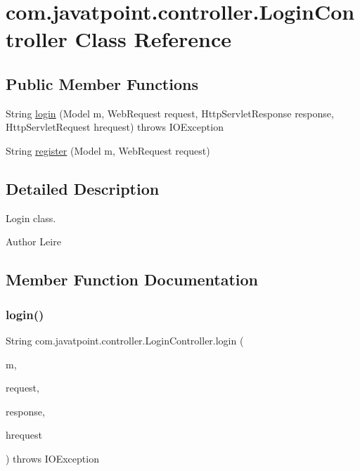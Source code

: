 \hypertarget{classcom_1_1javatpoint_1_1controller_1_1_login_controller}{}\section{com.\+javatpoint.\+controller.\+Login\+Controller Class Reference}
\label{classcom_1_1javatpoint_1_1controller_1_1_login_controller}
\subsection*{Public Member Functions}
\begin{DoxyCompactItemize}
\item 
String \mbox{\hyperlink{classcom_1_1javatpoint_1_1controller_1_1_login_controller_ac14f5ffa8f3fcdd0a908cb1311f12393}{login}} (Model m, Web\+Request request, Http\+Servlet\+Response response, Http\+Servlet\+Request hrequest)  throws I\+O\+Exception 
\item 
String \mbox{\hyperlink{classcom_1_1javatpoint_1_1controller_1_1_login_controller_adb27cb866c614d9060fd6cd3db3c4a3a}{register}} (Model m, Web\+Request request)
\end{DoxyCompactItemize}


\subsection{Detailed Description}
Login class.

\begin{DoxyAuthor}{Author}
Leire 
\end{DoxyAuthor}


\subsection{Member Function Documentation}
\mbox{\label{classcom_1_1javatpoint_1_1controller_1_1_login_controller_ac14f5ffa8f3fcdd0a908cb1311f12393}} 
\subsubsection{\texorpdfstring{login()}{login()}}
{\footnotesize\ttfamily String com.\+javatpoint.\+controller.\+Login\+Controller.\+login (\begin{DoxyParamCaption}\item[{Model}]{m,  }\item[{Web\+Request}]{request,  }\item[{Http\+Servlet\+Response}]{response,  }\item[{Http\+Servlet\+Request}]{hrequest }\end{DoxyParamCaption}) throws I\+O\+Exception\hspace{0.3cm}{\ttfamily [inline]}}

